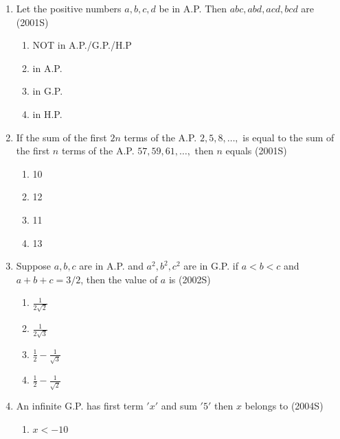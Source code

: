 \documentclass[journal]{IEEEtran}
\theoremstyle{remark}
\begin{document}
\begin{enumerate}
\begin{multicols}{4}
\begin{enumerate}
    \end{enumerate}
    \end{multicols}
\item Let the positive numbers $a,b,c,d$ be in A.P. Then $abc,abd,acd,bcd$ are \hfill(2001S)
    \begin{multicols}{2}
    \begin{enumerate}
        \item NOT in A.P./G.P./H.P
        \item in A.P.
        \item in G.P.
        \item  in H.P.
        \end{enumerate}
        \end{multicols}
\item If the sum of the first $2n$ terms of the A.P. $2,5,8,\dots,$ is equal to the sum of the first $n$ terms of the A.P. $ 57,59,61,\dots,$ then $n$ equals \hfill(2001S)
       \begin{multicols}{4}
        \begin{enumerate}
            \item 10
            \item 12
            \item 11
            \item 13
            \end{enumerate}
            \end{multicols}
\item Suppose $a,b,c$ are in A.P. and $a^2,b^2,c^2$ are in G.P. if $a<b<c$ and $a+b+c=3/2$, then the value of $a$ is \hfill(2002S)
            \begin{multicols}{4}
            \begin{enumerate}
             \item $\frac{1}{2\sqrt{2}}$
             \item $\frac{1}{2\sqrt{3}}$
             \item $\frac{1}{2}-\frac{1}{\sqrt{3}}$
             \item $\frac{1}{2}-\frac{1}{\sqrt{2}}$
            \end{enumerate}
            \end{multicols}
\item An infinite G.P. has first term $'x'$ and sum $'5'$ then $x$ belongs to \hfill(2004S)
            \begin{multicols}{4}
            \begin{enumerate}
                \item $x<-10$

\end{enumerate}
\end{multicols}
\end{enumerate}
\end{document}
